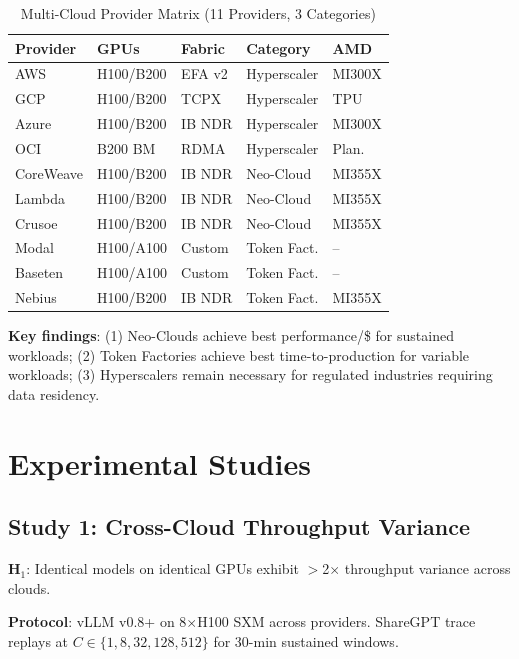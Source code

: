\documentclass[conference,10pt]{IEEEtran}
\begin{document}
\begin{table}[!htbp]
\caption{Multi-Cloud Provider Matrix (11 Providers, 3 Categories)}
\label{tab:cloud}
\centering\footnotesize
\begin{tabular}{@{}lllll@{}}
\toprule
\textbf{Provider} & \textbf{GPUs} & \textbf{Fabric} & \textbf{Category} & \textbf{AMD} \\
\midrule
AWS & H100/B200 & EFA v2 & Hyperscaler & MI300X \\
GCP & H100/B200 & TCPX & Hyperscaler & TPU \\
Azure & H100/B200 & IB NDR & Hyperscaler & MI300X \\
OCI & B200 BM & RDMA & Hyperscaler & Plan. \\
\midrule
CoreWeave & H100/B200 & IB NDR & Neo-Cloud & MI355X \\
Lambda & H100/B200 & IB NDR & Neo-Cloud & MI355X \\
Crusoe & H100/B200 & IB NDR & Neo-Cloud & MI355X \\
\midrule
Modal & H100/A100 & Custom & Token Fact. & -- \\
Baseten & H100/A100 & Custom & Token Fact. & -- \\
Nebius & H100/B200 & IB NDR & Token Fact. & MI355X \\
\bottomrule
\end{tabular}
\end{table}

\textbf{Key findings}: (1) Neo-Clouds achieve best performance/\$ for sustained workloads; (2) Token Factories achieve best time-to-production for variable workloads; (3) Hyperscalers remain necessary for regulated industries requiring data residency.

\section{Experimental Studies}
\label{sec:exp}

\subsection{Study 1: Cross-Cloud Throughput Variance}

\textbf{H$_1$}: Identical models on identical GPUs exhibit $>$2$\times$ throughput variance across clouds.

\textbf{Protocol}: vLLM v0.8+ on 8$\times$H100 SXM across providers. ShareGPT trace replays at $C \in \{1, 8, 32, 128, 512\}$ for 30-min sustained windows.
\end{document}
